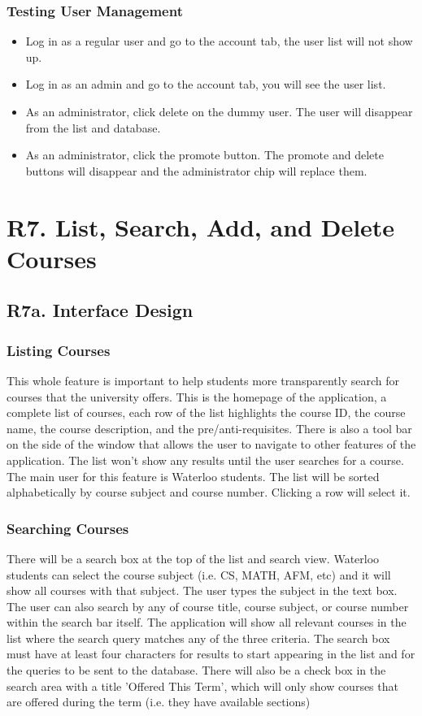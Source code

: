 \documentclass[12pt, a4paper]{article}
\begin{document}
\subsubsection*{Testing User Management}
\begin{itemize}
    \item Log in as a regular user and go to the account tab, the user list will not show up.
    \item Log in as an admin and go to the account tab, you will see the user list.
    \item As an administrator, click delete on the dummy user. The user will disappear from the list and database.
    \item As an administrator, click the promote button. The promote and delete buttons will disappear and the administrator chip will replace them.
\end{itemize}
\section*{R7. List, Search, Add, and Delete Courses}
\label{sec:R7}
\subsection*{R7a. Interface Design}
\subsubsection*{Listing Courses}
This whole feature is important to help students more transparently search for courses that the university offers. This is the homepage of the application, a complete list of courses, each row of the list highlights the course ID, the course name, the course description, and the pre/anti-requisites. There is also a tool bar on the side of the window that allows the user to navigate to other features of the application. The list won't show any results until the user searches for a course. The main user for this feature is Waterloo students. The list will be sorted alphabetically by course subject and course number. Clicking a row will select it.
\subsubsection*{Searching Courses}
There will be a search box at the top of the list and search view. Waterloo students can select the course subject (i.e. CS, MATH, AFM, etc) and it will show all courses with that subject. The user types the subject in the text box. The user can also search by any of course title, course subject, or course number within the search bar itself. The application will show all relevant courses in the list where the search query matches any of the three criteria. The search box must have at least four characters for results to start appearing in the list and for the queries to be sent to the database. There will also be a check box in the search area with a title 'Offered This Term', which will only show courses that are offered during the term (i.e. they have available sections)
\end{document}
